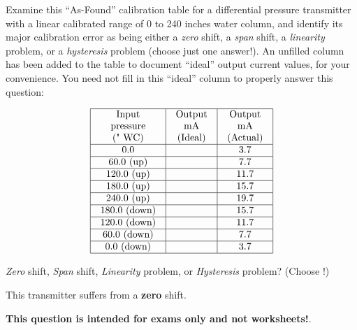 

Examine this ``As-Found'' calibration table for a differential pressure transmitter with a linear calibrated range of 0 to 240 inches water column, and identify its major calibration error as being either a {\it zero} shift, a {\it span} shift, a {\it linearity} problem, or a {\it hysteresis} problem (choose just one answer!).  An unfilled column has been added to the table to document ``ideal'' output current values, for your convenience.  You need not fill in this ``ideal'' column to properly answer this question:


$$\vbox{\offinterlineskip
\halign{\strut
\vrule \quad\hfil # \ \hfil & 
\vrule \quad\hfil # \ \hfil & 
\vrule \quad\hfil # \ \hfil \vrule \cr
\noalign{\hrule}
%
Input & Output & Output \cr
%
pressure & mA & mA \cr
%
(" WC) & (Ideal) & (Actual) \cr
%
\noalign{\hrule}
%
0.0 & & 3.7 \cr
%
\noalign{\hrule}
%
60.0 (up) & & 7.7 \cr
%
\noalign{\hrule}
%
120.0 (up) & & 11.7 \cr
%
\noalign{\hrule}
%
180.0 (up) & & 15.7 \cr
%
\noalign{\hrule}
%
240.0 (up) & & 19.7 \cr
%
\noalign{\hrule}
%
180.0 (down) & & 15.7 \cr
%
\noalign{\hrule}
%
120.0 (down) & & 11.7 \cr
%
\noalign{\hrule}
%
60.0 (down) & & 7.7 \cr
%
\noalign{\hrule}
%
0.0 (down) & & 3.7 \cr
%
\noalign{\hrule}
} %
}$$ %

{\it Zero} shift, {\it Span} shift, {\it Linearity} problem, or {\it Hysteresis} problem?  (Choose !)







This transmitter suffers from a {\bf zero} shift.







{\bf This question is intended for exams only and not worksheets!}.


